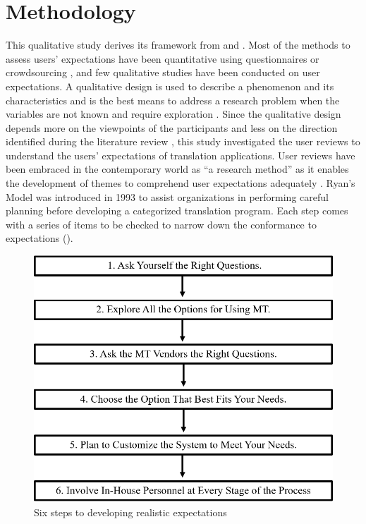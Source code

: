 \documentclass[english]{textolivre}
\begin{document}
\section{Methodology}\label{sec-organizacao-latex}
This qualitative study derives its framework from \textcite{kurz_conference_2002} and \textcite{ryan_machine_1993}. Most of the methods to assess users’ expectations have been quantitative using questionnaires or crowdsourcing \cite{zhao_understanding_2015}, and few qualitative studies have been conducted on user expectations. A qualitative design is used to describe a phenomenon and its characteristics \cite{nassaji_qualitative_2015} and is the best means to address a research problem when the variables are not known and require exploration \cite{creswell_research_2014}. Since the qualitative design depends more on the viewpoints of the participants and less on the direction identified during the literature review \cite{creswell_research_2014}, this study investigated the user reviews to understand the users’ expectations of translation applications. User reviews have been embraced in the contemporary world as “a research method” as it enables the development of themes to comprehend user expectations adequately \cite{yang_study_2018}. Ryan’s Model was introduced in 1993 to assist organizations in performing careful planning before developing a categorized translation program. Each step comes with a series of items to be checked to narrow down the conformance to expectations ().

\begin{figure}[h!]
    \centering
    \includegraphics[width=0.8\linewidth]{Fig1.png}
    \caption{Six steps to developing realistic expectations}
    \label{fig1}
\end{figure}
\end{document}
